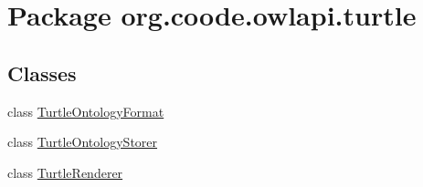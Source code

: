 \hypertarget{namespaceorg_1_1coode_1_1owlapi_1_1turtle}{\section{Package org.\-coode.\-owlapi.\-turtle}
\label{namespaceorg_1_1coode_1_1owlapi_1_1turtle}
}
\subsection*{Classes}
\begin{DoxyCompactItemize}
\item 
class \hyperlink{classorg_1_1coode_1_1owlapi_1_1turtle_1_1_turtle_ontology_format}{Turtle\-Ontology\-Format}
\item 
class \hyperlink{classorg_1_1coode_1_1owlapi_1_1turtle_1_1_turtle_ontology_storer}{Turtle\-Ontology\-Storer}
\item 
class \hyperlink{classorg_1_1coode_1_1owlapi_1_1turtle_1_1_turtle_renderer}{Turtle\-Renderer}
\end{DoxyCompactItemize}
